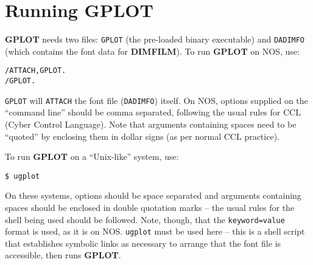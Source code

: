 \documentclass[a4paper,twoside,11pt]{article}
\newcommand{\newpara}{\par\vspace{4mm}\noindent}
\begin{document}
\section{Running \textbf{GPLOT}}
\textbf{GPLOT} needs two files: \texttt{GPLOT} (the pre-loaded binary executable) 
and \texttt{DADIMFO} (which contains
the font data for \textbf{DIMFILM}). To run \textbf{GPLOT} on NOS, use:
\begin{verbatim}
/ATTACH,GPLOT.
/GPLOT.
\end{verbatim}
\texttt{GPLOT} will \texttt{ATTACH} the font file (\texttt{DADIMFO}) itself.
On NOS, options supplied on the ``command line'' should be comma separated, following
the usual rules for CCL (Cyber Control Language). Note that arguments containing spaces
need to be ``quoted'' by enclosing them in dollar signs (as per normal CCL practice).

\newpara
To run \textbf{GPLOT} on a ``Unix-like'' system, use:
\begin{verbatim}
$ ugplot
\end{verbatim}
On these systems, options should be space separated and arguments containing spaces
should be enclosed in double quotation marks -- the usual rules for the shell being
used should be followed. Note, though, that the \texttt{keyword=value} format is used, as
it is on NOS. \texttt{ugplot} must be used here -- this is a shell script that establishes
symbolic links as necessary to arrange that the font file is accessible, then runs \textbf{GPLOT}.
\end{document}
